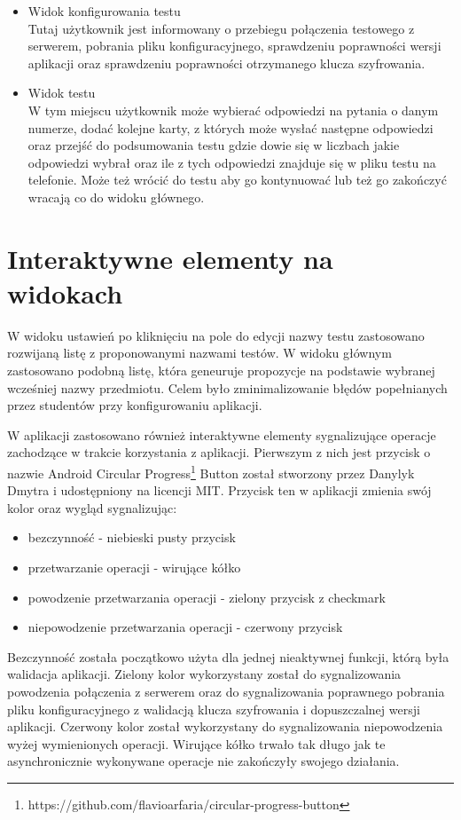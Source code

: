 \documentclass{report}
\begin{document}
\begin{itemize}
			\item Widok konfigurowania testu\\
			Tutaj użytkownik jest informowany o przebiegu połączenia testowego z serwerem, pobrania pliku konfiguracyjnego, sprawdzeniu poprawności wersji aplikacji oraz sprawdzeniu poprawności otrzymanego klucza szyfrowania.
			
			\item Widok testu\\
			W tym miejscu użytkownik może wybierać odpowiedzi na pytania o danym numerze, dodać kolejne karty, z których może wysłać następne odpowiedzi oraz przejść do podsumowania testu gdzie dowie się w liczbach jakie odpowiedzi wybrał oraz ile z tych odpowiedzi znajduje się w pliku testu na telefonie. Może też wrócić do testu aby go kontynuować lub też go zakończyć wracają co do widoku głównego.
			
		\end{itemize}
		
		\section{Interaktywne elementy na widokach}
		
		W widoku ustawień po kliknięciu na pole do edycji  nazwy testu zastosowano rozwijaną listę z proponowanymi nazwami testów.	W widoku głównym zastosowano podobną listę, która geneuruje propozycje na podstawie wybranej wcześniej nazwy przedmiotu. Celem było zminimalizowanie błędów popełnianych przez studentów przy konfigurowaniu aplikacji.
		
		W aplikacji zastosowano również interaktywne elementy sygnalizujące operacje zachodzące w trakcie korzystania z aplikacji.
		Pierwszym z nich jest przycisk o nazwie Android Circular Progress\footnote{https://github.com/flavioarfaria/circular-progress-button} Button został stworzony przez Danylyk Dmytra i udostępniony na licencji MIT. Przycisk ten w aplikacji zmienia swój kolor oraz wygląd sygnalizując:
		\begin{itemize}
			\item bezczynność - niebieski pusty przycisk
			\item przetwarzanie operacji - wirujące kółko
			\item powodzenie przetwarzania operacji - zielony przycisk z checkmark
			\item niepowodzenie przetwarzania operacji - czerwony przycisk 
		\end{itemize}
		Bezczynność została początkowo użyta dla jednej nieaktywnej funkcji, którą była walidacja aplikacji. Zielony kolor wykorzystany został do sygnalizowania powodzenia połączenia z serwerem oraz do sygnalizowania poprawnego pobrania pliku konfiguracyjnego z walidacją klucza szyfrowania i dopuszczalnej wersji aplikacji.
		Czerwony kolor został wykorzystany do sygnalizowania niepowodzenia wyżej wymienionych operacji.
		Wirujące kółko trwało tak długo jak te asynchronicznie wykonywane operacje nie zakończyły swojego działania.\\
		
\end{document}
